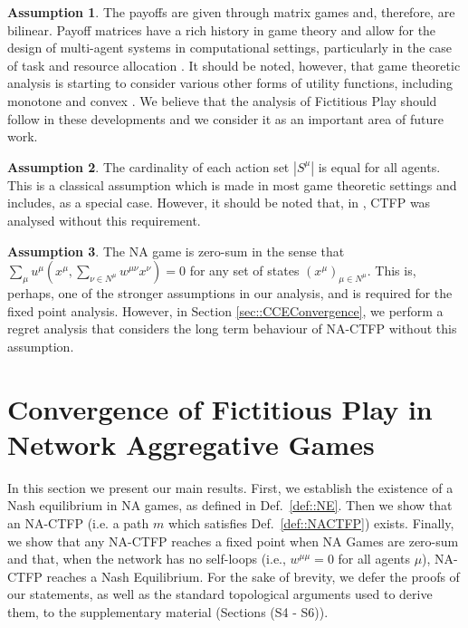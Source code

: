 \documentclass{article}
\theoremstyle{definition}
\newtheorem{assumption}{Assumption}
\newcommand{\actionset}[1]{S^{#1}}
\newcommand{\wmunu}{w^{\mu \nu}}
\newcommand{\xmu}{x^{\mu}}
\newcommand{\xnu}{x^{\nu}}
\newcommand{\weightedsum}{ \sum_{\nu \in N^\mu} \wmunu \xnu}
\begin{document}
  \begin{assumption}\label{ass::matrixgame}
    The payoffs are given through matrix games and, therefore, are bilinear. Payoff matrices
    have a rich history in game theory and allow for the design of multi-agent systems in
    computational settings, particularly in the case of task and resource allocation \cite{Nisan2007}. It should be noted, however, that game
    theoretic analysis is starting to consider various other forms of utility functions,
    including monotone and convex \cite{Parise2020}. We believe that the analysis of
    Fictitious Play should follow in these developments and we consider it as an important area
    of future work.
  \end{assumption}

  \begin{assumption}\label{ass::sameactions}
    The cardinality of each action set $|\actionset{\mu}|$ is equal for all agents. This is
    a classical assumption which is made in most game theoretic settings and includes, as a
    special case. However, it should be noted that,
    in \cite{Ewerhart2020}, CTFP was analysed without this requirement.  
  \end{assumption}

  \begin{assumption}\label{ass::zerosum}
    The NA game is zero-sum in the sense that $\sum_{\mu} u^\mu(\xmu, \weightedsum) = 0$ for any set
    of states $(x^\mu)_{\mu \in N^\mu}$. This is, perhaps, one of the stronger assumptions in
    our analysis, and is required for the fixed point analysis. However, in Section
    \ref{sec::CCEConvergence}, we perform a regret analysis that considers the long term
    behaviour of NA-CTFP without this assumption.
  \end{assumption}

\section{Convergence of Fictitious Play in Network Aggregative Games}
\label{sec::CTFPAnalysis}

  
  In this section we present our main results. First, we establish the
  existence of a Nash equilibrium in NA games, as defined in
  Def.~\ref{def::NE}. Then we show that an NA-CTFP (i.e. a path $m$ which satisfies Def.~\ref{def::NACTFP}) exists. Finally, we show that any NA-CTFP reaches a fixed point when
  NA Games are zero-sum and that, when the network has no self-loops
  (i.e., $w^{\mu \mu} = 0$ for all agents $\mu$), NA-CTFP reaches a Nash Equilibrium. For the sake
  of brevity, we defer the proofs of our statements, as well as the
  standard topological arguments used to derive them, to the
  supplementary material (Sections (S4 - S6)).
\end{document}
